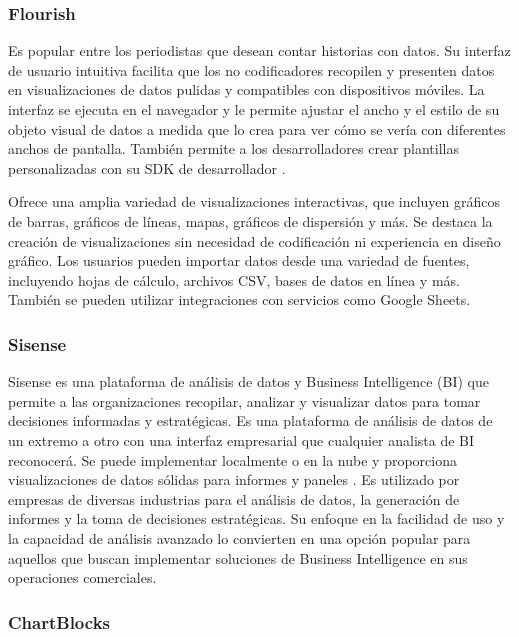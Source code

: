 \documentclass[
  11pt,
  bookmarksnumbered]{article}
\begin{document}
\hypertarget{flourish}{%
\subsubsection{Flourish}\label{flourish}}

Es popular entre los periodistas que desean contar historias con datos.
Su interfaz de usuario intuitiva facilita que los no codificadores recopilen y presenten datos en visualizaciones de datos pulidas y compatibles con dispositivos móviles.
La interfaz se ejecuta en el navegador y le permite ajustar el ancho y el estilo de su objeto visual de datos a medida que lo crea para ver cómo se vería con diferentes anchos de pantalla.
También permite a los desarrolladores crear plantillas personalizadas con su SDK de desarrollador \textcite{upwork2023best}.

Ofrece una amplia variedad de visualizaciones interactivas, que incluyen gráficos de barras, gráficos de líneas, mapas, gráficos de dispersión y más.
Se destaca la creación de visualizaciones sin necesidad de codificación ni experiencia en diseño gráfico.
Los usuarios pueden importar datos desde una variedad de fuentes, incluyendo hojas de cálculo, archivos CSV, bases de datos en línea y más.
También se pueden utilizar integraciones con servicios como Google Sheets.

\hypertarget{sisense}{%
\subsubsection{Sisense}\label{sisense}}

Sisense es una plataforma de análisis de datos y Business Intelligence (BI) que permite a las organizaciones recopilar, analizar y visualizar datos para tomar decisiones informadas y estratégicas.
Es una plataforma de análisis de datos de un extremo a otro con una interfaz empresarial que cualquier analista de BI reconocerá.
Se puede implementar localmente o en la nube y proporciona visualizaciones de datos sólidas para informes y paneles \textcite{upwork2023best}.
Es utilizado por empresas de diversas industrias para el análisis de datos, la generación de informes y la toma de decisiones estratégicas.
Su enfoque en la facilidad de uso y la capacidad de análisis avanzado lo convierten en una opción popular para aquellos que buscan implementar soluciones de Business Intelligence en sus operaciones comerciales.

\hypertarget{chartblocks}{%
\subsubsection{ChartBlocks}\label{chartblocks}}
\end{document}
